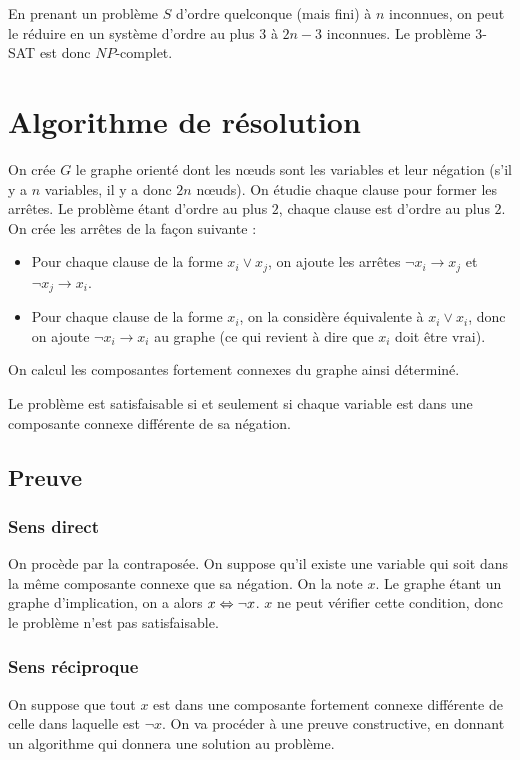 En prenant un problème $S$ d'ordre quelconque (mais fini) à $n$ inconnues, on
peut le réduire en un système d'ordre au plus $3$ à $2n-3$ inconnues. Le
problème $3$-SAT est donc $NP$-complet.

\section{Algorithme de résolution}
On crée $G$ le graphe orienté dont les nœuds sont les variables et leur
négation (s'il y a $n$ variables, il y a donc $2n$ nœuds). On étudie chaque
clause pour former les arrêtes. Le problème étant d'ordre au plus $2$, chaque
clause est d'ordre au plus $2$. On crée les arrêtes de la façon suivante :
\begin{itemize}
 \item Pour chaque clause de la forme $x_i \vee x_j$, on ajoute les arrêtes
       $\neg x_i \rightarrow x_j$ et $\neg x_j \rightarrow x_i$.
 \item Pour chaque clause de la forme $x_i$, on la considère équivalente à
       $x_i \vee x_i$, donc on ajoute $\neg x_i \rightarrow x_i$ au graphe (ce
       qui revient à dire que $x_i$ doit être vrai).
\end{itemize}

On calcul les composantes fortement connexes du graphe ainsi déterminé.

Le problème est satisfaisable si et seulement si chaque variable est dans une
composante connexe différente de sa négation.

\subsection{Preuve}
\subsubsection{Sens direct}
On procède par la contraposée. On suppose qu'il existe une variable qui soit
dans la même composante connexe que sa négation. On la note $x$. Le graphe
étant un graphe d'implication, on a alors $x \Leftrightarrow \neg x$. $x$ ne peut
vérifier cette condition, donc le problème n'est pas satisfaisable.

\subsubsection{Sens réciproque}
On suppose que tout $x$ est dans une composante fortement connexe différente de
celle dans laquelle est $\neg x$. On va procéder à une preuve constructive, en
donnant un algorithme qui donnera une solution au problème.

